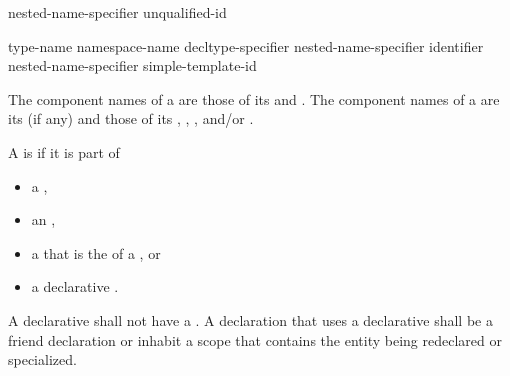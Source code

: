 \documentclass{wg21}
\begin{document}
%
%
%
\begin{bnf}
    \br
    nested-name-specifier  unqualified-id
\end{bnf}

%
%
%
\begin{bnf}
    \br
    \terminal{::}\br
    type-name \terminal{::}\br
    namespace-name \terminal{::}\br
    decltype-specifier \terminal{::}\br
    \br
    nested-name-specifier identifier \terminal{::}\br
    nested-name-specifier  simple-template-id \terminal{::}
\end{bnf}

\pnum
{}%
The component names of a  are those of
its  and .
The component names of a  are
its  (if any) and those of its
,
,
, and/or
.

\pnum
A  is  if it is part of
\begin{itemize}
    \item
    a ,
    \item
    an ,
    \item
    a 
    that is the  of a , or
    \item
    a declarative .
\end{itemize}
A declarative 
shall not have a .
A declaration that uses a declarative 
shall be a friend declaration or
inhabit a scope that contains the entity being redeclared or specialized.
\end{document}
